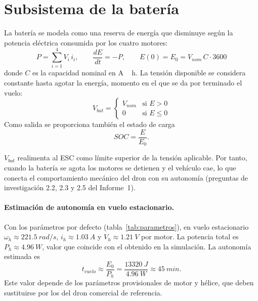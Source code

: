 \section{Subsistema de la batería}
\label{sec:bateria}

La batería se modela como una reserva de energía que disminuye según la potencia
eléctrica consumida por los cuatro motores:
\begin{equation}
  P = \sum_{i=1}^{4} V_i\, i_i , \qquad \frac{dE}{dt} = -P ,
  \qquad E(0) = E_0 = V_{nom}\, C \cdot 3600
  \label{eq:bateria}
\end{equation}
donde $C$ es la capacidad nominal en \si{A\,h}. La tensión disponible se considera
constante hasta agotar la energía, momento en el que se da por terminado el vuelo:
\begin{equation}
  V_{bat} =
  \begin{cases}
    V_{nom} & \text{si } E > 0 \\
    0       & \text{si } E \le 0
  \end{cases}
\end{equation}
Como salida se proporciona también el estado de carga
\begin{equation}
  SOC = \frac{E}{E_0}.
\end{equation}

$V_{bat}$ realimenta al ESC como límite superior de la tensión aplicable. Por tanto,
cuando la batería se agota los motores se detienen y el vehículo cae, lo que conecta
el comportamiento mecánico del dron con su autonomía (preguntas de investigación
2.2, 2.3 y 2.5 del Informe~1).

\paragraph{Estimación de autonomía en vuelo estacionario.}
Con los parámetros por defecto (tabla~\ref{tab:parametros}), en vuelo estacionario
$\omega_h \approx \SI{221.5}{rad/s}$, $i_h \approx \SI{1.03}{A}$ y
$V_h \approx \SI{1.21}{V}$ por motor. La potencia total es $P_h \approx \SI{4.96}{W}$,
valor que coincide con el obtenido en la simulación. La autonomía estimada es
\begin{equation}
  t_{vuelo} \approx \frac{E_0}{P_h} = \frac{\SI{13320}{J}}{\SI{4.96}{W}} \approx \SI{45}{min}.
\end{equation}
Este valor depende de los parámetros provisionales de motor y hélice, que deben
sustituirse por los del dron comercial de referencia.
